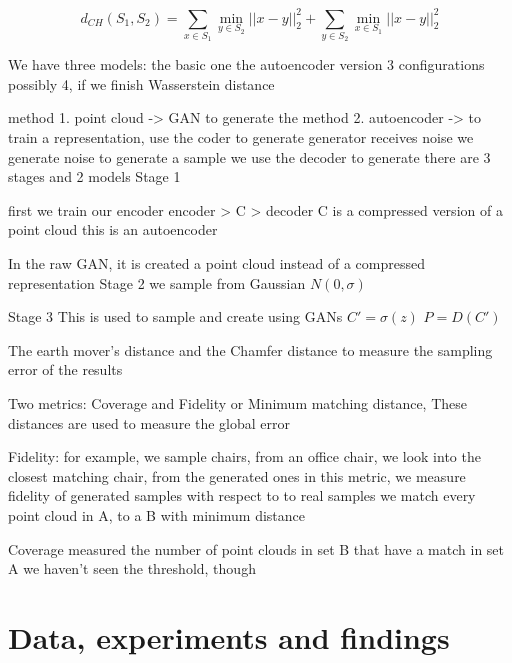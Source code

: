 \documentclass[12pt]{article}
\newcommand{\contentdescription}[1]{}
\newcommand{\TODO}[2]{{#2}}
\begin{document}
    \[
        d_{CH}(S_{1}, S_{2}) = \sum_{x \in S_{1}} \min _{y \in S_{2}} || x - y||_{2}^{2} +
        \sum_{y \in S_{2}} \min_{x \in S_{1}} ||x - y||_{2}^{2}
    \]


    \TODO{Rephrase this part}{
        We have three models:
        the basic one
        the autoencoder version
        3 configurations possibly 4, if we finish Wasserstein distance

        method 1. point cloud -> GAN to generate the
        method 2. autoencoder -> to train a representation, use the coder to generate
        generator receives noise
        we generate noise to generate a sample
        we use the decoder to generate
        there are 3 stages and 2 models
        Stage 1

        first we train our encoder
        encoder > C > decoder
        C is a compressed version of a point cloud
        this is an autoencoder

        In the raw GAN, it is created a point cloud instead of a compressed representation
        Stage 2
        we sample from Gaussian $N(0,\sigma)$


        Stage 3
        This is used to sample and create using GANs
        $C' = \sigma(z)$
        $P = D(C')$


        The earth mover's distance and the Chamfer distance to measure the sampling error of the results

        Two metrics: Coverage and Fidelity or Minimum matching distance,
        These distances are used to measure the global error

        Fidelity: for example, we sample chairs,
        from an office chair, we look into the closest matching chair, from the generated ones
        in this metric, we measure fidelity of generated samples with respect to to real samples
        we match every point cloud in A, to a B with minimum distance

        Coverage measured the number of point clouds in set B that have a match in set A
        we haven't seen the threshold, though
    }


    \section{Data, experiments and findings}
    \contentdescription{
        Data, experiments and findings (30-40\%):

        Describe the data you are working with for your project. What type of data is it? Where did it come from? How much data are you working with? Did you have to do any preprocessing, filtering, or other special treatment to use this data in your project?
        Describe and present the experiments that you performed and what is the reason for those experiments. Where applicable define evaluation metrics that you used. Discuss the results that you got.
    }
\end{document}
